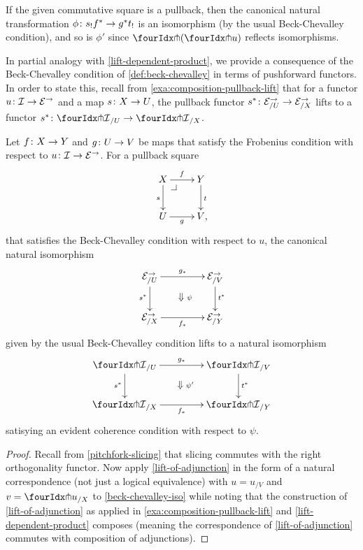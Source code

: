 \documentclass[reqno,10pt,a4paper,oneside,draft]{amsart}
\begin{document}
\begin{remark} \label{beck-chevalley-iso}
If the given commutative square is a pullback, then the canonical natural transformation $\phi \colon s_! f^* \to g^* t_!$ is an isomorphism (by the usual Beck-Chevalley condition), and so is $\phi'$ since $\liftl{(\liftr{u})}$ reflects isomorphisms.
\end{remark}

In partial analogy with \cref{lift-dependent-product}, we provide a consequence of the Beck-Chevalley condition of \cref{def:beck-chevalley} in terms of pushforward functors.
In order to state this, recall from \cref{exa:composition-pullback-lift} that for a functor $u \colon \mathcal{I} \to \mathcal{E}^\to$ and a map $s \colon X \to U$, the pullback functor $s^* \colon \mathcal{E}^\to_{/U} \to \mathcal{E}^\to_{/X}$ lifts to a functor $s^* \co {\liftr{\cal{I}}}_{/U} \to {\liftr{\cal{I}}}_{/X}$.

\begin{proposition} \label{lift-pushforward-BC}
Let $f \colon X \to Y$ and $g \colon U \to V$ be maps that satisfy the Frobenius condition with respect to $u \colon \mathcal{I} \to \mathcal{E}^\to$.
For a pullback square
\[
\xymatrix{
  X
  \ar[r]^{f}
  \ar[d]_{s}
  \pullback{dr}
&
  Y
  \ar[d]^{t}
\\
  U
  \ar[r]_{g}
&
  V
\rlap{,}}
\]
that satisfies the Beck-Chevalley condition with respect to $u$, the canonical natural isomorphism
\[
\xymatrix@C+2em{
  \catE^\to_{/U}
  \ar[r]^{g_*}
  \ar[d]_{s^*}
  \ar@{}[dr]|{\textstyle\Downarrow \rlap{$\labelstyle\psi$}}
&
  \catE^\to_{/V}
  \ar[d]^{t^*}
\\
  \catE^\to_{/X}
  \ar[r]_{f_*}
&
  \catE^\to_{/Y}
}
\]
given by the usual Beck-Chevalley condition lifts to a natural isomorphism
\[
\xymatrix@C+2em{
  {\liftr{\cal{I}}}_{/U}
  \ar[r]^{g_*}
  \ar[d]_{s^*}
  \ar@{}[dr]|{\textstyle\Downarrow \rlap{$\labelstyle\psi'$}}
&
  {\liftr{\cal{I}}}_{/V}
  \ar[d]^{t^*}
\\
  {\liftr{\cal{I}}}_{/X}
  \ar[r]_{f_*}
&
  {\liftr{\cal{I}}}_{/Y}
}
\]
satisying an evident coherence condition with respect to $\psi$.
\end{proposition}

\begin{proof}
Recall from \cref{pitchfork-slicing} that slicing commutes with the right orthogonality functor.
Now apply \cref{lift-of-adjunction} in the form of a natural correspondence (not just a logical equivalence) with $u = u_{/V}$ and $v = \liftr{u}_{/X}$ to \cref{beck-chevalley-iso} while noting that the construction of \cref{lift-of-adjunction} as applied in \cref{exa:composition-pullback-lift} and \cref{lift-dependent-product} composes (meaning the correspondence of \cref{lift-of-adjunction} commutes with composition of adjunctions).
\end{proof}
\end{document}

